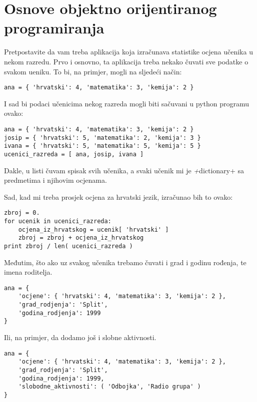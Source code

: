 \chapter{Osnove objektno orijentiranog programiranja}

Pretpostavite da vam treba aplikacija koja izračunava statistike ocjena učenika u nekom 
razredu. Prvo i osnovno, ta aplikacija treba nekako čuvati sve podatke o svakom ueniku.
To bi, na primjer, mogli na sljedeći način:

\begin{lstlisting}
ana = { 'hrvatski': 4, 'matematika': 3, 'kemija': 2 }
\end{lstlisting}

I sad bi podaci učenicima nekog razreda mogli biti sačuvani u python programu ovako:

\begin{lstlisting}
ana = { 'hrvatski': 4, 'matematika': 3, 'kemija': 2 }
josip = { 'hrvatski': 5, 'matematika': 2, 'kemija': 3 }
ivana = { 'hrvatski': 5, 'matematika': 5, 'kemija': 5 }
ucenici_razreda = [ ana, josip, ivana ]
\end{lstlisting}

Dakle, u listi čuvam spisak svih učenika, a svaki učenik mi je \emph+dictionary+ \TODO
sa predmetima i njihovim ocjenama. 

Sad, kad mi treba prosjek ocjena za hrvatski jezik, izračunao bih to ovako:

\begin{lstlisting}
zbroj = 0.
for ucenik in ucenici_razreda:
	ocjena_iz_hrvatskog = ucenik[ 'hrvatski' ]
	zbroj = zbroj + ocjena_iz_hrvatskog
print zbroj / len( ucenici_razreda )
\end{lstlisting}

Međutim, što ako uz svakog učenika trebamo čuvati i grad i godinu rođenja, te
imena roditelja.

\begin{lstlisting}
ana = {
	'ocjene': { 'hrvatski': 4, 'matematika': 3, 'kemija': 2 },
	'grad_rodjenja': 'Split',
	'godina_rodjenja': 1999
}
\end{lstlisting}

Ili, na primjer, da dodamo još i slobne aktivnosti. 

\begin{lstlisting}
ana = {
	'ocjene': { 'hrvatski': 4, 'matematika': 3, 'kemija': 2 },
	'grad_rodjenja': 'Split',
	'godina_rodjenja': 1999,
	'slobodne_aktivnosti': ( 'Odbojka', 'Radio grupa' )
}
\end{lstlisting}

